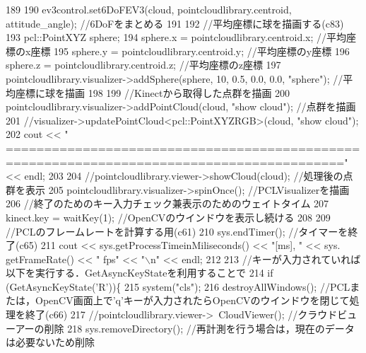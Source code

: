 \begin{DoxyCode}
189             
190             ev3control.set6DoFEV3(cloud, pointcloudlibrary.centroid, attitude\_angle); \textcolor{comment}{//6DoFをまとめる}
191             
192             \textcolor{comment}{//平均座標に球を描画する(c83)}
193             pcl::PointXYZ sphere;
194             sphere.x = pointcloudlibrary.centroid.x; \textcolor{comment}{//平均座標のx座標}
195             sphere.y = pointcloudlibrary.centroid.y; \textcolor{comment}{//平均座標のy座標}
196             sphere.z = pointcloudlibrary.centroid.z; \textcolor{comment}{//平均座標のz座標}
197             pointcloudlibrary.visualizer->addSphere(sphere, 10, 0.5, 0.0, 0.0, \textcolor{stringliteral}{"sphere"}); \textcolor{comment}{//平均座標に球を描画}
198 
199             \textcolor{comment}{//Kinectから取得した点群を描画}
200             pointcloudlibrary.visualizer->addPointCloud(cloud, \textcolor{stringliteral}{"show cloud"}); \textcolor{comment}{//点群を描画}
201             \textcolor{comment}{//visualizer->updatePointCloud<pcl::PointXYZRGB>(cloud, "show cloud");}
202             cout << \textcolor{stringliteral}{"
      =========================================================================================="} << endl;
203 
204             \textcolor{comment}{//pointcloudlibrary.viewer->showCloud(cloud); //処理後の点群を表示}
205             pointcloudlibrary.visualizer->spinOnce(); \textcolor{comment}{//PCLVisualizerを描画}
206             \textcolor{comment}{//終了のためのキー入力チェック兼表示のためのウェイトタイム}
207             kinect.key = waitKey(1); \textcolor{comment}{//OpenCVのウインドウを表示し続ける}
208 
209             \textcolor{comment}{//PCLのフレームレートを計算する用(c61)}
210             sys.endTimer(); \textcolor{comment}{//タイマーを終了(c65)}
211             cout << sys.getProcessTimeinMiliseconds() << \textcolor{stringliteral}{"[ms], "} << sys.
      getFrameRate() << \textcolor{stringliteral}{" fps"} << \textcolor{stringliteral}{"\(\backslash\)n"} << endl;
212 
213             \textcolor{comment}{//キーが入力されていれば以下を実行する．GetAsyncKeyStateを利用することで}
214             \textcolor{keywordflow}{if} (GetAsyncKeyState(\textcolor{charliteral}{'R'}))\{
215                 system(\textcolor{stringliteral}{"cls"});
216                 destroyAllWindows(); \textcolor{comment}{//PCLまたは，OpenCV画面上で'q'キーが入力されたらOpenCVのウインドウを閉じて処理を終了(c66)}
217                 \textcolor{comment}{//pointcloudlibrary.viewer->~CloudViewer(); //クラウドビューアーの削除}
218                 sys.removeDirectory(); \textcolor{comment}{//再計測を行う場合は，現在のデータは必要ないため削除}

\end{DoxyCode}
